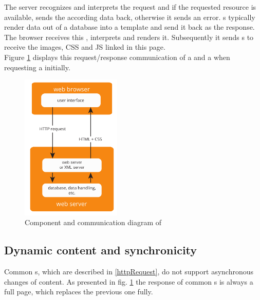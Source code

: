 \noindent{}The server recognizes and interprets the request and if the requested resource is available, sends the according data back, otherwise it sends an error.
\WebApplication{}s typically render data out of a database into a \html{} template and send it back as the response.
The browser receives this \webPage{}, interprets and renders it.
Subsequently it sends \httpRequest{}s to receive the images, CSS and JS linked in this page.
\\
Figure \ref{fig:http_components} displays this request/response communication of a \webBrowser{} and a \webServer{} when requesting a \webPage{} initially.

\begin{figure}[H]
\centering
\includegraphics[height=7cm]{images/http.pdf}
\caption[http_components]{Component and communication diagram of \http{}}
\label{fig:http_components}
\end{figure}

\subsection{Dynamic content and synchronicity\label{synchronicity}}

Common \httpRequest{}s, which are described in \ref{httpRequest}, do not support asynchronous changes of content. As presented in fig. \ref{fig:http_components} the response of common \httpRequest{}s is always a full page, which replaces the previous one fully.

